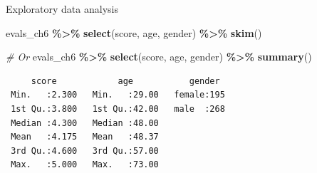 \documentclass[
  ignorenonframetext,
]{beamer}
\newenvironment{Shaded}{\begin{snugshade}}{\end{snugshade}}
\newcommand{\CommentTok}[1]{\textcolor[rgb]{0.56,0.35,0.01}{\textit{#1}}}
\newcommand{\FunctionTok}[1]{\textcolor[rgb]{0.13,0.29,0.53}{\textbf{#1}}}
\newcommand{\NormalTok}[1]{#1}
\newcommand{\SpecialCharTok}[1]{\textcolor[rgb]{0.81,0.36,0.00}{\textbf{#1}}}
\begin{document}
\begin{frame}[fragile]{Exploratory data analysis}
\protect\hypertarget{exploratory-data-analysis-10}{}
\normalsize

\begin{Shaded}
\begin{Highlighting}[]
\NormalTok{evals\_ch6 }\SpecialCharTok{\%\textgreater{}\%} 
  \FunctionTok{select}\NormalTok{(score, age, gender) }\SpecialCharTok{\%\textgreater{}\%} 
  \FunctionTok{skim}\NormalTok{()}
\end{Highlighting}
\end{Shaded}

\normalsize

\begin{Shaded}
\begin{Highlighting}[]
\CommentTok{\# Or}
\NormalTok{evals\_ch6 }\SpecialCharTok{\%\textgreater{}\%} 
  \FunctionTok{select}\NormalTok{(score, age, gender) }\SpecialCharTok{\%\textgreater{}\%} 
  \FunctionTok{summary}\NormalTok{()}
\end{Highlighting}
\end{Shaded}

\begin{verbatim}
     score            age           gender   
 Min.   :2.300   Min.   :29.00   female:195  
 1st Qu.:3.800   1st Qu.:42.00   male  :268  
 Median :4.300   Median :48.00               
 Mean   :4.175   Mean   :48.37               
 3rd Qu.:4.600   3rd Qu.:57.00               
 Max.   :5.000   Max.   :73.00               
\end{verbatim}
\end{frame}
\end{document}

